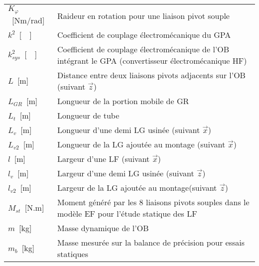 \begin{table}
{\begin{tabular}{l m{12cm}}
$K_{\varphi}$~[Nm/rad]& Raideur en rotation pour une liaison pivot souple   \\
$k^2$~[~~]      & Coefficient de couplage électromécanique du GPA \\
$k^2_{sys}$~[~~]& Coefficient de couplage électromécanique de l'OB intégrant le GPA (convertisseur électromécanique HF) \\  \cline{1-1}
$L$~[m]    & Distance entre deux liaisons pivots adjacents sur l'OB (suivant $\vec{z}$) \\
$L_{GR}$~[m]    & Longueur de la portion mobile de GR \\
$L_t$~[m]       & Longueur de tube \\
$L_{v}$~[m]     & Longueur d'une demi LG usinée (suivant $\vec{x}$) \\
$L_{v2}$~[m]    & Longueur de la LG ajoutée au montage (suivant $\vec{x}$) \\
$l$~[m]         & Largeur d'une LF (suivant $\vec{x}$) \\
$l_{v}$~[m]     & Largeur d'une demi LG usinée (suivant $\vec{z}$) \\
$l_{v2}$~[m]    & Largeur de la LG ajoutée au montage(suivant $\vec{z}$) \\  \cline{1-1}
$M_{st}$~[N.m]        & Moment généré par les 8 liaisons pivots souples dans le modèle EF pour l'étude statique des LF\\
$m$~[kg]          & Masse dynamique de l'OB  \\
$m_b$~[kg]         & Masse mesurée sur la balance de précision pour essais statiques  \\
            \end{tabular}}
\end{table}

